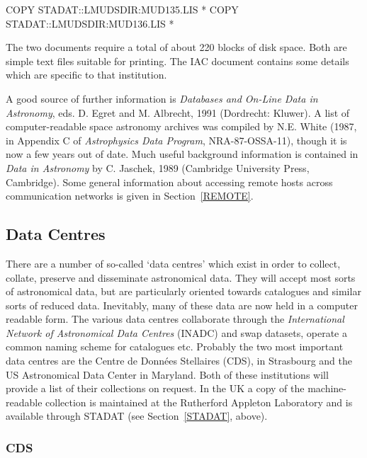\documentclass[twoside,11pt,nolof]{starlink}
\begin{document}
\begin{terminalv}
    COPY  STADAT::LMUDSDIR:MUD135.LIS  *
    COPY  STADAT::LMUDSDIR:MUD136.LIS  *
\end{terminalv}

The two documents require a total of about 220 blocks of disk space.
Both are simple text files suitable for printing. The IAC document
contains some details which are specific to that institution.

A good source of further information is \textit{Databases and On-Line Data
in Astronomy}, eds. D. Egret and M. Albrecht, 1991 (Dordrecht: Kluwer).
A list of computer-readable space astronomy archives was compiled by
N.E. White (1987, in Appendix C of \textit{Astrophysics Data Program},
NRA-87-OSSA-11), though it is now a few years out of date. Much useful
background information is contained in \textit{Data in Astronomy} by C.
Jaschek, 1989 (Cambridge University Press, Cambridge). Some general
information about accessing remote hosts across communication networks
is given in Section~\ref{REMOTE}.

\subsection{Data Centres
\label{INADC}}

There are a number of so-called `data centres' which exist in order to
collect, collate, preserve and disseminate astronomical data. They will
accept most sorts of astronomical data, but are particularly oriented
towards catalogues and similar sorts of reduced data. Inevitably, many
of these data are now held in a computer readable form. The various data
centres collaborate through the \textit{International Network of
Astronomical Data Centres} (INADC) and swap datasets, operate a common
naming scheme for catalogues etc. Probably the two most important data
centres are the Centre de Donn\'{e}es Stellaires (CDS), in Strasbourg
and the US Astronomical Data Center in Maryland. Both of these
institutions will provide a list of their collections on request. In the
UK a copy of the machine-readable collection is maintained at the
Rutherford Appleton Laboratory and is available through STADAT (see
Section~\ref{STADAT}, above).

\subsubsection{CDS
\label{CDS}}
\end{document}
